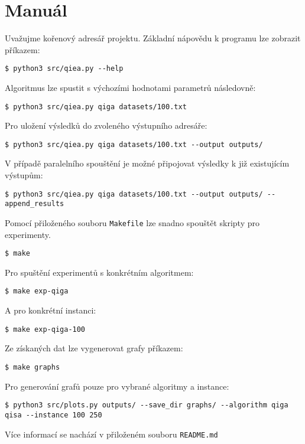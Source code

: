 \chapter{Manuál}
Uvažujme kořenový adresář projektu. Základní nápovědu k programu lze zobrazit příkazem:
\begin{lstlisting}[style=bash]
    $ python3 src/qiea.py --help
\end{lstlisting}
Algoritmus lze spustit s výchozími hodnotami parametrů následovně:
\begin{lstlisting}[style=bash]
    $ python3 src/qiea.py qiga datasets/100.txt
\end{lstlisting}
Pro uložení výsledků do zvoleného výstupního adresáře:
\begin{lstlisting}[style=bash]
    $ python3 src/qiea.py qiga datasets/100.txt --output outputs/
\end{lstlisting}
V případě paralelního spouštění je možné připojovat výsledky k již existujícím výstupům:
\begin{lstlisting}[style=bash]
    $ python3 src/qiea.py qiga datasets/100.txt --output outputs/ --append_results
\end{lstlisting}
Pomocí přiloženého souboru \texttt{Makefile} lze snadno spouštět skripty pro experimenty.
\begin{lstlisting}[style=bash]
    $ make
\end{lstlisting}
Pro spuštění experimentů s konkrétním algoritmem:
\begin{lstlisting}[style=bash]
    $ make exp-qiga
\end{lstlisting}
A pro konkrétní instanci:
\begin{lstlisting}[style=bash]
    $ make exp-qiga-100
\end{lstlisting}
Ze získaných dat lze vygenerovat grafy příkazem:
\begin{lstlisting}[style=bash]
    $ make graphs
\end{lstlisting}
Pro generování grafů pouze pro vybrané algoritmy a instance:
\begin{lstlisting}[style=bash]
    $ python3 src/plots.py outputs/ --save_dir graphs/ --algorithm qiga qisa --instance 100 250
\end{lstlisting}
Více informací se nachází v přiloženém souboru \texttt{README.md}

